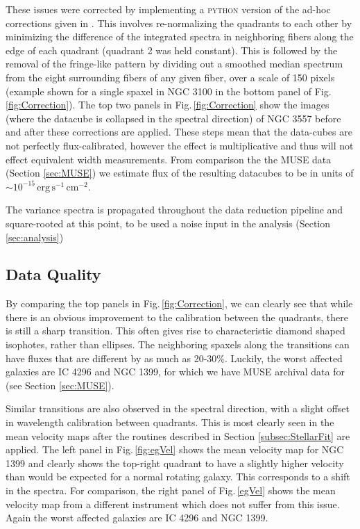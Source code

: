		These issues were corrected by implementing a \textsc{python} version of the ad-hoc corrections given in \citet{Lagerholm2012}. This involves re-normalizing the quadrants to each other by minimizing the difference of the integrated spectra in neighboring fibers along the edge of each quadrant (quadrant 2 was held constant). This is followed by the removal of the fringe-like pattern by dividing out a smoothed median spectrum from the eight surrounding fibers of any given fiber, over a scale of 150 pixels (example shown for a single spaxel in NGC 3100 in the bottom panel of Fig.\,\ref{fig:Correction}). The top two panels in Fig.\,\ref{fig:Correction} show the images (where the datacube is collapsed in the spectral direction) of NGC 3557 before and after these corrections are applied. These steps mean that the data-cubes are not perfectly flux-calibrated, however the effect is multiplicative and thus will not effect equivalent width measurements. From comparison the the MUSE data (Section \ref{sec:MUSE}) we estimate flux of the resulting datacubes to be in units of $\sim 10^{-15} \, \mathrm{erg\,s^{-1}\,cm^{-2}}$. 

		

		The variance spectra is propagated throughout the data reduction pipeline and square-rooted at this point, to be used a noise input in the analysis (Section \ref{sec:analysis})

	\subsection{Data Quality}
		\label{subsec:VIMOSartifacts}
		By comparing the top panels in Fig.\,\ref{fig:Correction}, we can clearly see that while there is an obvious improvement to the calibration between the quadrants, there is still a sharp transition. This often gives rise to characteristic diamond shaped isophotes, rather than ellipses. The neighboring spaxels along the transitions can have fluxes that are different by as much as 20-30\%. Luckily, the worst affected galaxies are IC 4296 and NGC 1399, for which we have MUSE archival data for (see Section \ref{sec:MUSE}). 

		Similar transitions are also observed in the spectral direction, with a slight offset in wavelength calibration between quadrants. This is most clearly seen in the mean velocity maps after the routines described in Section \ref{subsec:StellarFit} are applied. The left panel in Fig.\,\ref{fig:egVel} shows the mean velocity map for NGC 1399 and clearly shows the top-right quadrant to have a slightly higher velocity than would be expected for a normal rotating galaxy. This corresponds to a shift in the spectra. For comparison, the right panel of Fig.\,\ref{egVel} shows the mean velocity map from a different instrument which does not suffer from this issue. Again the worst affected galaxies are IC 4296 and NGC 1399.

